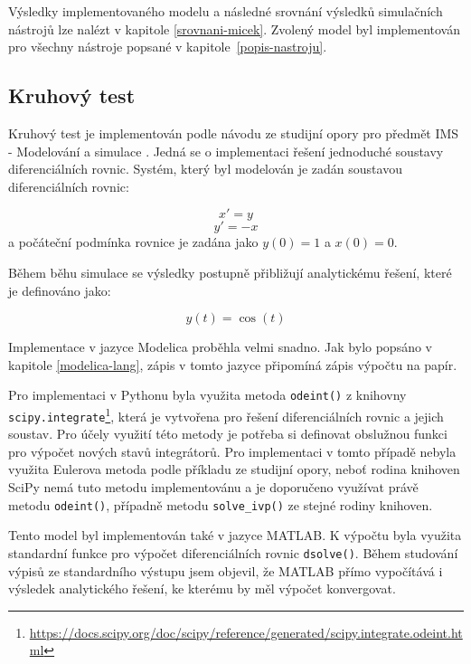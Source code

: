 Výsledky implementovaného modelu a následné srovnání výsledků simulačních nástrojů lze nalézt v kapitole \ref{srovnani-micek}.
Zvolený model byl implementován pro všechny nástroje popsané v kapitole~\ref{popis-nastroju}.

\subsection{Kruhový test}
\label{kruhovy-test}

Kruhový test je implementován podle návodu ze studijní opory pro předmět IMS - Modelování a simulace \cite{IMS-skripta}. Jedná se o implementaci řešení jednoduché soustavy diferenciálních rovnic. Systém, který byl modelován je zadán soustavou diferenciálních rovnic:

\begin{equation}
   x' = y
\end{equation}
\begin{equation}
    y' = -x
\end{equation}
a počáteční podmínka rovnice je zadána jako $y(0) = 1$ a $x(0) = 0$.

Během běhu simulace se výsledky postupně přibližují analytickému řešení, které je definováno jako:

\begin{equation}
    y(t) = \cos(t)
\end{equation}


Implementace v jazyce Modelica proběhla velmi snadno. Jak bylo popsáno v kapitole \ref{modelica-lang}, zápis v tomto jazyce připomíná zápis výpočtu na papír. 

Pro implementaci v Pythonu byla využita metoda \texttt{odeint()} z knihovny \texttt{scipy.integrate}\footnote{\url{https://docs.scipy.org/doc/scipy/reference/generated/scipy.integrate.odeint.html}}, která je vytvořena pro řešení diferenciálních rovnic a jejich soustav. Pro účely využití této metody je potřeba si definovat obslužnou funkci pro výpočet nových stavů integrátorů. Pro implementaci v tomto případě nebyla využita Eulerova metoda podle příkladu ze studijní opory, neboť rodina knihoven SciPy nemá tuto metodu implementovánu a je doporučeno využívat právě metodu \texttt{odeint()}, případně metodu \texttt{solve\_ivp()} ze stejné rodiny knihoven.

Tento model byl implementován také v jazyce MATLAB. K výpočtu byla využita standardní funkce pro výpočet diferenciálních rovnic \texttt{dsolve()}. Během studování výpisů ze standardního výstupu jsem objevil, že MATLAB přímo vypočítává i výsledek analytického řešení, ke kterému by měl výpočet konvergovat. 



